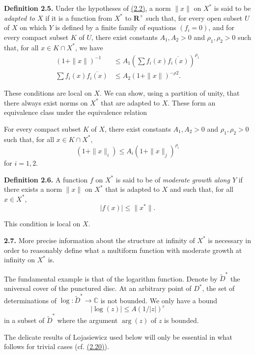 \documentclass{report}
\newenvironment{itenv*}
  {\phantomsection\par\medskip\noindent\itshape}
  {\medskip}
\newenvironment{rmenv}[1]
  {\phantomsection\par\medskip\noindent\textbf{#1.}\rmfamily}
  {\medskip}
\newcommand{\CC}{\mathbb{C}}
\newcommand{\RR}{\mathbf{R}}
\renewcommand{\leq}{\leqslant}
\newcommand{\oldpage}[1]{\marginpar{\footnotesize$\Big\vert$ \textit{p.~#1}}}
\begin{document}
\begin{rmenv}{Definition 2.5}
\label{II.2.5}
  Under the hypotheses of \hyperref[II.2.2]{(2.2)}, a norm $\|x\|$ on $X^*$ is said to be \emph{adapted to $X$} if it is a function from $X^*$ to $\RR^+$ such that, for every open subset $U$ of $X$ on which $Y$ is defined by a finite family of equations $(f_i=0)$, and for every compact subset $K$ of $U$, there exist constants $A_1,A_2>0$ and $\rho_1,\rho_2>0$ such that, for all $x\in K\cap X^*$, we have
  \[
    \begin{aligned}
      (1+\|x\|)^{-1}
      &\leq A_1\left(\sum f_i(x)\overline{f_i(x)}\right)^{\rho_1}
    \\\sum f_i(x)\overline{f_i(x)}
      &\leq A_2(1+\|x\|)^{-\rho2}.
    \end{aligned}
  \]

  \oldpage{63}
  These conditions are local on $X$.
  We can show, using a partition of unity, that there always exist norms on $X^*$ that are adapted to $X$.
  These form an equivalence class under the equivalence relation

  \begin{itenv*}
  \label{II.2.5.*'M}
    For every compact subset $K$ of $X$, there exist constants $A_1,A_2>0$ and $\rho_1,\rho_2>0$ such that, for all $x\in K\cap X^*$,
    \[
      (1+\|x\|_i) \leq A_i(1+\|x\|_j)^{\rho_i}
    \tag{$*'$M}
    \]
    for $i=1,2$.
  \end{itenv*}
\end{rmenv}

\begin{rmenv}{Definition 2.6}
\label{II.2.6}
  A function $f$ on $X^*$ is said to be of \emph{moderate growth along $Y$} if there exists a norm $\|x\|$ on $X^*$ that is adapted to $X$ and such that, for all $x\in X^*$,
  \[
    |f(x)| \leq \|x^*\|.
  \]

  This condition is local on $X$.
\end{rmenv}

\begin{rmenv}{2.7}
\label{II.2.7}
  More precise information about the structure at infinity of $X^*$ is necessary in order to reasonably define what a multiform function with moderate growth at infinity on $X^*$ is.

  The fundamental example is that of the logarithm function.
  Denote by $\widetilde{D}^*$ the universal cover of the punctured disc.
  At an arbitrary point of $D^*$, the set of determinations of $\log\colon\widetilde{D}^*\to\CC$ is not bounded.
  We only have a bound
  \[
    |\log(z)| \leq A(1/|z|)^\varepsilon
  \]
  in a subset of $\widetilde{D}^*$ where the argument $\arg(z)$ of $z$ is bounded.

  The delicate results of Lojasiewicz used below will only be essential in what follows for trivial cases (cf. \hyperref[II.2.20]{(2.20)}).
\end{rmenv}
\end{document}
